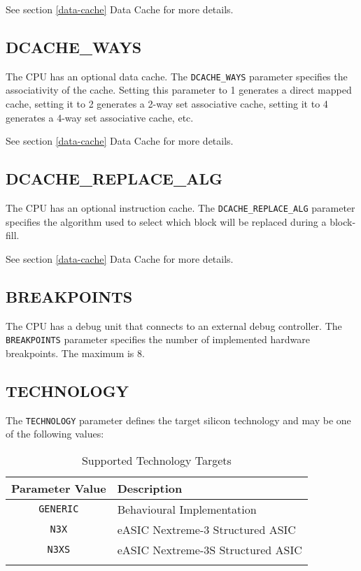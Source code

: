 See section \ref{data-cache} Data Cache for more details.

\subsection{DCACHE\_WAYS}\label{dcache_ways}

The CPU has an optional data cache. The \texttt{DCACHE\_WAYS} parameter specifies
the associativity of the cache. Setting this parameter to 1 generates a
direct mapped cache, setting it to 2 generates a 2-way set associative
cache, setting it to 4 generates a 4-way set associative cache, etc.

See section \ref{data-cache} Data Cache for more details.

\subsection{DCACHE\_REPLACE\_ALG}\label{dcache_replace_alg}

The CPU has an optional instruction cache. The \texttt{DCACHE\_REPLACE\_ALG}
parameter specifies the algorithm used to select which block will be
replaced during a block-fill.

See
section \ref{data-cache} Data Cache for more details.

\subsection{BREAKPOINTS}\label{breakpoints}

The CPU has a debug unit that connects to an external debug controller.
The \texttt{BREAKPOINTS} parameter specifies the number of implemented hardware
breakpoints. The maximum is 8.

\subsection{TECHNOLOGY}\label{technology}

The \texttt{TECHNOLOGY} parameter defines the target silicon technology and may
be one of the following values:

\begin{longtable}[]{@{}cl@{}}
\toprule
Parameter Value & Description\tabularnewline
\midrule
\endhead
\texttt{GENERIC} & Behavioural Implementation\tabularnewline
\texttt{N3X} & eASIC Nextreme-3 Structured ASIC\tabularnewline
\texttt{N3XS} & eASIC Nextreme-3S Structured ASIC\tabularnewline
\bottomrule
\caption{Supported Technology Targets}
\label{tab:supported-tech-targets}

\end{longtable}

